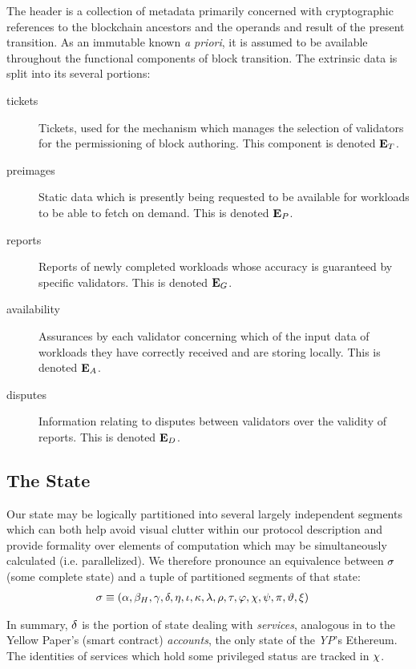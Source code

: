 The header is a collection of metadata primarily concerned with cryptographic references to the blockchain ancestors and the operands and result of the present transition. As an immutable known \emph{a priori}, it is assumed to be available throughout the functional components of block transition. The extrinsic data is split into its several portions:

\begin{description}
  \item[tickets] Tickets, used for the mechanism which manages the selection of validators for the permissioning of block authoring. This component is denoted $\mathbf{E}_T$.
  \item[preimages] Static data which is presently being requested to be available for workloads to be able to fetch on demand. This is denoted $\mathbf{E}_P$.
  \item[reports] Reports of newly completed workloads whose accuracy is guaranteed by specific validators. This is denoted $\mathbf{E}_G$.
  \item[availability] Assurances by each validator concerning which of the input data of workloads they have correctly received and are storing locally. This is denoted $\mathbf{E}_A$.
  \item[disputes] Information relating to disputes between validators over the validity of reports. This is denoted $\mathbf{E}_D$.
\end{description}

\subsection{The State}

Our state may be logically partitioned into several largely independent segments which can both help avoid visual clutter within our protocol description and provide formality over elements of computation which may be simultaneously calculated (i.e. parallelized). We therefore pronounce an equivalence between $\sigma$ (some complete state) and a tuple of partitioned segments of that state:
\begin{align}\label{eq:statecomposition}
  \sigma &\equiv (\alpha, \beta_H, \gamma, \delta, \eta, \iota, \kappa, \lambda, \rho, \tau, \varphi, \chi, \psi, \pi, \vartheta, \xi)
\end{align}

In summary, $\delta$ is the portion of state dealing with \emph{services}, analogous in \Jam to the Yellow Paper's (smart contract) \emph{accounts}, the only state of the \emph{YP}'s Ethereum. The identities of services which hold some privileged status are tracked in $\chi$.

